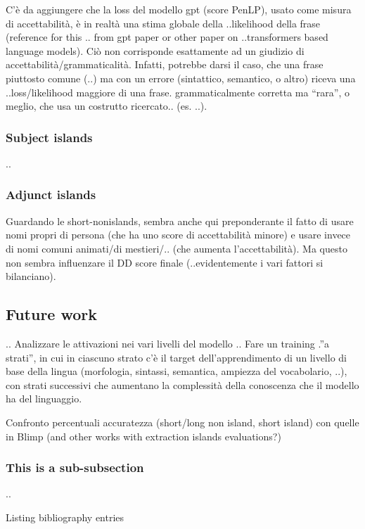 C’è da aggiungere che la loss del modello gpt (score PenLP), usato come misura di accettabilità, è in realtà una stima globale della ..likelihood della frase (reference for this .. from gpt paper or other paper on ..transformers based language models). Ciò non corrisponde esattamente ad un giudizio di accettabilità/grammaticalità. Infatti, potrebbe darsi il caso, che una frase piuttosto comune (..) ma con un errore (sintattico, semantico, o altro) riceva una ..loss/likelihood maggiore di una frase. grammaticalmente corretta ma “rara”, o meglio, che usa un costrutto ricercato.. (es. ..).


\subsubsection{Subject islands}
..

\subsubsection{Adjunct islands}

Guardando le short-nonislands, sembra anche qui preponderante il fatto di usare nomi propri di persona (che ha uno score di accettabilità minore) e usare invece di nomi comuni animati/di mestieri/.. (che aumenta l’accettabilità). Ma questo non sembra influenzare il DD score finale (..evidentemente i vari fattori si bilanciano).


\subsection{Future work}
..
Analizzare le attivazioni nei vari livelli del modello ..
Fare un training .”a strati”, in cui in ciascuno strato c’è il target dell’apprendimento di un livello di base della lingua (morfologia, sintassi, semantica, ampiezza del vocabolario, ..), con strati successivi che aumentano la complessità della conoscenza che il modello ha del linguaggio.


Confronto percentuali accuratezza (short/long non island, short island) con quelle in Blimp
(and other works with extraction islands evaluations?)

\subsubsection{This is a sub-subsection}
..



Listing bibliography entries \citep{wei2021frequency, hu2020systematic, lau2020furiously,  sprouse2016experimental}

